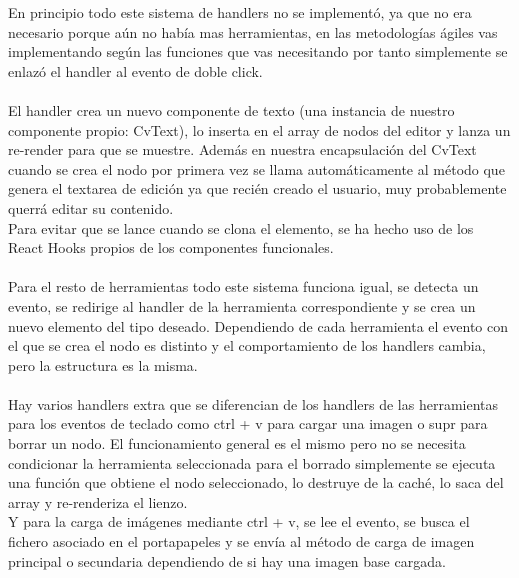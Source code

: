 En principio todo este sistema de handlers no se implementó, ya que no era necesario 
porque aún no había mas herramientas, en las metodologías ágiles vas implementando según
las funciones que vas necesitando por tanto simplemente se enlazó el handler al evento
de doble click. 
\\\\
El handler crea un nuevo componente de texto (una instancia de nuestro componente propio: CvText),
lo inserta en el array de nodos del editor y lanza un re-render para que se muestre.
Además en nuestra encapsulación del CvText cuando se crea el nodo por primera vez se
llama automáticamente al método que genera el textarea de edición ya que recién creado
el usuario, muy probablemente querrá editar su contenido.
\\
Para evitar que se lance cuando se clona el elemento, se ha hecho uso de los React Hooks\cite{React-Hooks}
propios de los componentes funcionales.
\\\\
Para el resto de herramientas todo este sistema funciona igual, se detecta un evento, se
redirige al handler de la herramienta correspondiente y se crea un nuevo elemento del tipo
deseado. Dependiendo de cada herramienta el evento con el que se crea el nodo es distinto y el 
comportamiento de los handlers cambia, pero la estructura es la misma. 
\\\\
Hay varios handlers extra que se diferencian de los handlers de las herramientas para los
eventos de teclado como ctrl + v para cargar una imagen o supr para borrar un nodo.
El funcionamiento general es el mismo pero no se necesita condicionar la herramienta seleccionada
para el borrado simplemente se ejecuta una función que obtiene el nodo seleccionado, lo
destruye de la caché, lo saca del array y re-renderiza el lienzo.
\\
Y para la carga de imágenes mediante ctrl + v, se lee el evento, se busca el fichero asociado
en el portapapeles y se envía al método de carga de imagen principal o secundaria dependiendo
de si hay una imagen base cargada.

\newpage
